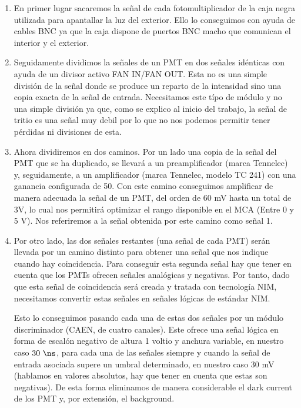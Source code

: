 \begin{enumerate} 
\item{} En primer lugar sacaremos la señal de cada fotomultiplicador de la caja negra utilizada para apantallar la luz del exterior. Ello lo conseguimos con ayuda de cables BNC  ya que la caja dispone de puertos BNC macho que comunican el interior y el exterior.

\item {} Seguidamente dividimos la señales de un PMT en dos señales idénticas con ayuda de un divisor activo FAN IN/FAN OUT. Esta no es una simple división de la señal donde se produce un reparto de la intensidad sino una copia exacta de la señal de entrada. Necesitamos este típo de módulo y no una simple división ya que, como se explico al inicio del trabajo, la señal de tritio es una señal muy debil por lo que no nos podemos permitir tener pérdidas ni divisiones de esta.

\item {} Ahora dividiremos en dos caminos. Por un lado una copia de la señal del PMT que se ha duplicado, se llevará a un preamplificador (marca Tennelec) y, seguidamente, a un amplificador (marca Tennelec, modelo TC 241) con una ganancia configurada de 50. Con este camino conseguimos amplificar de manera adecuada la señal de un PMT, del orden de 60 mV hasta un total de 3V, lo cual nos permitirá optimizar el rango disponible en el MCA (Entre 0 y 5 V). Nos referiremos a la señal obtenida por este camino como señal 1.

\item{} Por otro lado, las dos señales restantes (una señal de cada PMT) serán llevada por un camino distinto para obtener una señal que nos indique cuando hay coincidencia. Para conseguir esta segunda señal hay que tener en cuenta que los PMTs ofrecen señales analógicas y negativas. Por tanto, dado que esta señal de coincidencia será creada y tratada con tecnología NIM, necesitamos convertir estas señales en señales lógicas de estándar NIM. 

Esto lo conseguimos pasando cada una de estas dos señales por un módulo discriminador (CAEN, de cuatro canales). Este ofrece una señal lógica en forma de escalón negativo de altura 1 voltio y anchura variable, en nuestro caso $30~\ns$, para cada una de las señales siempre y cuando la señal de entrada asociada supere un umbral determinado, en nuestro caso 30 mV (hablamos en valores absolutos, hay que tener en cuenta que estas son negativas). De esta forma eliminamos de manera considerable el dark current de los PMT y, por extensión, el background.


\end{enumerate}
